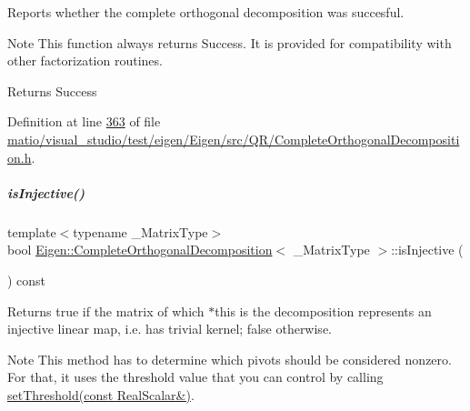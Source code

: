 Reports whether the complete orthogonal decomposition was succesful. 

\begin{DoxyNote}{Note}
This function always returns {\ttfamily Success}. It is provided for compatibility with other factorization routines. 
\end{DoxyNote}
\begin{DoxyReturn}{Returns}
{\ttfamily Success} 
\end{DoxyReturn}


Definition at line \hyperlink{matio_2visual__studio_2test_2eigen_2_eigen_2src_2_q_r_2_complete_orthogonal_decomposition_8h_source_l00363}{363} of file \hyperlink{matio_2visual__studio_2test_2eigen_2_eigen_2src_2_q_r_2_complete_orthogonal_decomposition_8h_source}{matio/visual\+\_\+studio/test/eigen/\+Eigen/src/\+Q\+R/\+Complete\+Orthogonal\+Decomposition.\+h}.

\mbox{\label{group___q_r___module_a2740067b81ec3e0ad20a2bea9a5a475f}} 
\subparagraph{\texorpdfstring{is\+Injective()}{isInjective()}\hspace{0.1cm}{\footnotesize\ttfamily [1/2]}}
{\footnotesize\ttfamily template$<$typename \+\_\+\+Matrix\+Type$>$ \\
bool \hyperlink{group___q_r___module_class_eigen_1_1_complete_orthogonal_decomposition}{Eigen\+::\+Complete\+Orthogonal\+Decomposition}$<$ \+\_\+\+Matrix\+Type $>$\+::is\+Injective (\begin{DoxyParamCaption}{ }\end{DoxyParamCaption}) const\hspace{0.3cm}{\ttfamily [inline]}}

\begin{DoxyReturn}{Returns}
true if the matrix of which $\ast$this is the decomposition represents an injective linear map, i.\+e. has trivial kernel; false otherwise.
\end{DoxyReturn}
\begin{DoxyNote}{Note}
This method has to determine which pivots should be considered nonzero. For that, it uses the threshold value that you can control by calling \hyperlink{group___q_r___module_aa9c9f7cbde9d58ca5552381b70ad8d82}{set\+Threshold(const Real\+Scalar\&)}. 
\end{DoxyNote}


